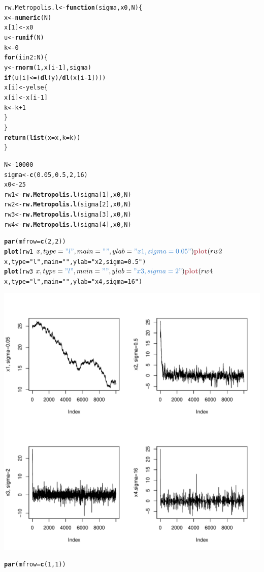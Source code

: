 \documentclass{article}\usepackage[]{graphicx}\usepackage[]{color}
\makeatletter
\def\maxwidth{ %
  \ifdim\Gin@nat@width>\linewidth
    \linewidth
  \else
    \Gin@nat@width
  \fi
}
\newcommand{\hlstr}[1]{\textcolor[rgb]{0.192,0.494,0.8}{#1}}%
\newcommand{\hlkwd}[1]{\textcolor[rgb]{0.737,0.353,0.396}{\textbf{#1}}}%
\newenvironment{kframe}{%
 \def\at@end@of@kframe{}%
 \ifinner\ifhmode%
  \def\at@end@of@kframe{\end{minipage}}%
  \begin{minipage}{\columnwidth}%
 \fi\fi%
 \def\FrameCommand##1{\hskip\@totalleftmargin \hskip-\fboxsep
 \colorbox{shadecolor}{##1}\hskip-\fboxsep
     \hskip-\linewidth \hskip-\@totalleftmargin \hskip\columnwidth}%
 \MakeFramed {\advance\hsize-\width
   \@totalleftmargin\z@ \linewidth\hsize
   \@setminipage}}%
 {\par\unskip\endMakeFramed%
 \at@end@of@kframe}
\newenvironment{knitrout}{}{} %
\makeatother
\begin{document}
\begin{itemize}
\begin{knitrout}
\begin{kframe}
\begin{alltt}
rw.Metropolis.l <- \hlkwd{function}(sigma, x0, N) \{
    x <- \hlkwd{numeric}(N)
    x[1] <- x0
    u <- \hlkwd{runif}(N)
    k <- 0
    \hlkwd{for} (i in 2:N) \{
        y <- \hlkwd{rnorm}(1, x[i - 1], sigma)
        \hlkwd{if} (u[i] <= (\hlkwd{dl}(y)/\hlkwd{dl}(x[i - 1]))) 
            x[i] <- y else \{
            x[i] <- x[i - 1]
            k <- k + 1
        \}
    \}
    \hlkwd{return}(\hlkwd{list}(x = x, k = k))
\}

N <- 10000
sigma <- \hlkwd{c}(0.05, 0.5, 2, 16)
x0 <- 25
rw1 <- \hlkwd{rw.Metropolis.l}(sigma[1], x0, N)
rw2 <- \hlkwd{rw.Metropolis.l}(sigma[2], x0, N)
rw3 <- \hlkwd{rw.Metropolis.l}(sigma[3], x0, N)
rw4 <- \hlkwd{rw.Metropolis.l}(sigma[4], x0, N)


\hlkwd{par}(mfrow = \hlkwd{c}(2, 2))
\hlkwd{plot}(rw1$x, type = \hlstr{"l"}, main = \hlstr{""}, ylab = \hlstr{"x1, sigma=0.05"})
\hlkwd{plot}(rw2$x, type = \hlstr{"l"}, main = \hlstr{""}, ylab = \hlstr{"x2, sigma=0.5"})
\hlkwd{plot}(rw3$x, type = \hlstr{"l"}, main = \hlstr{""}, ylab = \hlstr{"x3, sigma=2"})
\hlkwd{plot}(rw4$x, type = \hlstr{"l"}, main = \hlstr{""}, ylab = \hlstr{"x4,sigma=16"})
\end{alltt}
\end{kframe}
\includegraphics[width=\maxwidth]{figure/nine4} 
\begin{kframe}\begin{alltt}
\hlkwd{par}(mfrow = \hlkwd{c}(1, 1))
\end{alltt}
\end{kframe}
\end{knitrout}


\end{itemize}
\end{document}
